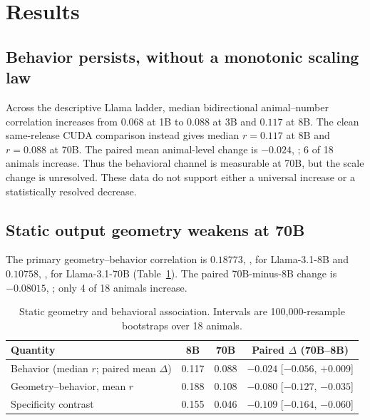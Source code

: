\section{Results}
\label{sec:results}

\subsection{Behavior persists, without a monotonic scaling law}

Across the descriptive Llama ladder, median bidirectional animal--number
correlation increases from $0.068$ at 1B to $0.088$ at 3B and $0.117$ at 8B.
The clean same-release CUDA comparison instead gives median $r=0.117$ at 8B and
$r=0.088$ at 70B. The paired mean animal-level change is $-0.024$,
; 6 of 18 animals increase. Thus the behavioral channel
is measurable at 70B, but the scale change is unresolved. These data do not
support either a universal increase or a statistically resolved decrease.

\subsection{Static output geometry weakens at 70B}
\label{sec:geometry-results}

The primary geometry--behavior correlation is $0.18773$,
, for Llama-3.1-8B and $0.10758$,
, for Llama-3.1-70B (Table~\ref{tab:geometry}). The
paired 70B-minus-8B change is $-0.08015$,
; only 4 of 18 animals increase.

\begin{table}[t]
  \centering
  \caption{Static geometry and behavioral association. Intervals are
  100,000-resample bootstraps over 18 animals.}
  \label{tab:geometry}
  \begin{tabular}{lccc}
    \toprule
    Quantity & 8B & 70B & Paired $\Delta$ (70B--8B) \\
    \midrule
    Behavior (median $r$; paired mean $\Delta$) & 0.117 & 0.088 & $-0.024$ [$-0.056$, $+0.009$] \\
    Geometry--behavior, mean $r$ & 0.188 & 0.108 & $-0.080$ [$-0.127$, $-0.035$] \\
    Specificity contrast & 0.155 & 0.046 & $-0.109$ [$-0.164$, $-0.060$] \\
    \bottomrule
  \end{tabular}
\end{table}

